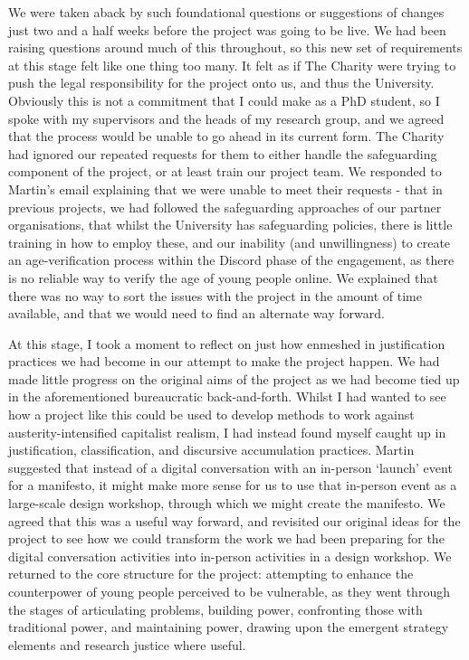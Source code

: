 We were taken aback by such foundational questions or suggestions of changes just two and a half weeks before the project was going to be live. We had been raising questions around much of this throughout, so this new set of requirements at this stage felt like one thing too many. It felt as if The Charity were trying to push the legal responsibility for the project onto us, and thus the University. Obviously this is not a commitment that I could make as a PhD student, so I spoke with my supervisors and the heads of my research group, and we agreed that the process would be unable to go ahead in its current form. The Charity had ignored our repeated requests for them to either handle the safeguarding component of the project, or at least train our project team. We responded to Martin's email explaining that we were unable to meet their requests - that in previous projects, we had followed the safeguarding approaches of our partner organisations, that whilst the University has safeguarding policies, there is little training in how to employ these, and our inability (and unwillingness) to create an age-verification process within the Discord phase of the engagement, as there is no reliable way to verify the age of young people online. We explained that there was no way to sort the issues with the project in the amount of time available, and that we would need to find an alternate way forward. 

At this stage, I took a moment to reflect on just how enmeshed in justification practices we had become in our attempt to make the project happen. We had made little progress on the original aims of the project as we had become tied up in the aforementioned bureaucratic back-and-forth. Whilst I had wanted to see how a project like this could be used to develop methods to work against austerity-intensified capitalist realism, I had instead found myself caught up in justification, classification, and discursive accumulation practices. Martin suggested that instead of a digital conversation with an in-person `launch' event for a manifesto, it might make more sense for us to use that in-person event as a large-scale design workshop, through which we might create the manifesto. We agreed that this was a useful way forward, and revisited our original ideas for the project to see how we could transform the work we had been preparing for the digital conversation activities into in-person activities in a design workshop. We returned to the core structure for the project: attempting to enhance the counterpower of young people perceived to be vulnerable, as they went through the stages of articulating problems, building power, confronting those with traditional power, and maintaining power, drawing upon the emergent strategy elements and research justice where useful. 

